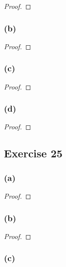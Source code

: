 \documentclass[14pt]{extarticle}
\begin{document}
\begin{proof}

\end{proof}

\subsubsection{(b)}

\begin{proof}

\end{proof}

\subsubsection{(c)}

\begin{proof}

\end{proof}

\subsubsection{(d)}

\begin{proof}

\end{proof}

\subsection{Exercise 25}

\subsubsection{(a)}

\begin{proof}

\end{proof}

\subsubsection{(b)}

\begin{proof}

\end{proof}

\subsubsection{(c)}
\end{document}
